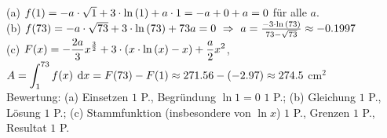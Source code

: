 \documentclass[11pt]{exam}
\begin{document}
\begin{questions}
{\begin{solution}
		(a) $f(1)=-a\*\sqrt{1}+3\*\ln{1}+a\*1=-a+0+a=0$ für alle $a$.\\
		(b) $f(73)=-a\*\sqrt{73}+3\*\ln{73}+73a=0\ \Rightarrow\ a=\frac{-3\*\ln{73}}{73-\sqrt{73}}\approx-0.1997$\\
		(c) $\ds F(x)=-\frac{2a}{3}x^{\frac{3}{2}}+3\*\left(x\*\ln{x}-x\right)+\frac{a}{2}x^2$, \quad $\displaystyle A=\int_1^{73}f(x)\:\operatorname{d}\!{x}=F(73)-F(1)\approx271.56-(-2.97)\approx274.5$ cm$^2$\\
		Bewertung: (a) Einsetzen $1$ P., Begründung $\ln{1}=0$ $1$ P.; (b) Gleichung $1$ P., Lösung $1$ P.; (c) Stammfunktion (insbesondere von $\ln{x}$) $1$ P., Grenzen $1$ P., Resultat $1$ P.
\end{solution}}
{}


\end{questions}
\end{document}
